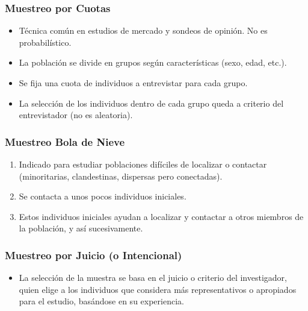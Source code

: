 \documentclass[12pt, letterpaper]{article}
\begin{document}
\subsubsection{Muestreo por Cuotas}
\begin{itemize} %
    \item Técnica común en estudios de mercado y sondeos de opinión. No es probabilístico.
    \item La población se divide en grupos según características (sexo, edad, etc.).
    \item Se fija una cuota de individuos a entrevistar para cada grupo.
    \item La selección de los individuos dentro de cada grupo queda a criterio del entrevistador (no es aleatoria). %
\end{itemize}

\subsubsection{Muestreo Bola de Nieve}
\begin{enumerate}
    \item Indicado para estudiar poblaciones difíciles de localizar o contactar (minoritarias, clandestinas, dispersas pero conectadas). %
    \item Se contacta a unos pocos individuos iniciales.
    \item Estos individuos iniciales ayudan a localizar y contactar a otros miembros de la población, y así sucesivamente.
\end{enumerate}

\subsubsection{Muestreo por Juicio (o Intencional)}
\begin{itemize}
    \item La selección de la muestra se basa en el juicio o criterio del investigador, quien elige a los individuos que considera más representativos o apropiados para el estudio, basándose en su experiencia. %
\end{itemize}
\end{document}
